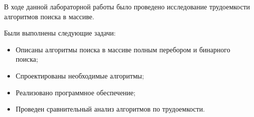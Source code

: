
В ходе данной лабораторной работы было проведено исследование трудоемкости алгоритмов поиска в массиве.

Были выполнены следующие задачи:
\begin{itemize}
    \item Описаны алгоритмы поиска в массиве полным перебором и бинарного поиска;
    \item Спроектированы необходимые алгоритмы;
    \item Реализовано программное обеспечение;
    \item Проведен сравнительный анализ алгоритмов по трудоемкости.
\end{itemize}